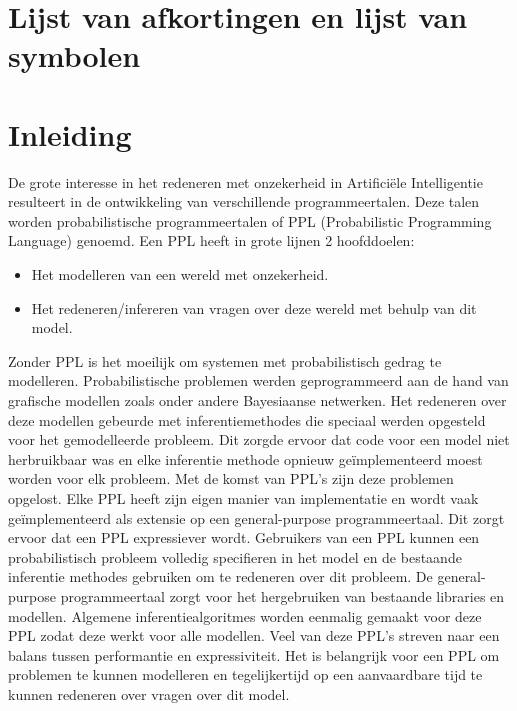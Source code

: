 \documentclass[12pt,a4paper,oneside]{book}
\theoremstyle{definition}
\begin{document}
\chapter{Lijst van afkortingen en lijst van symbolen}
\tableofcontents


\newpage
\mainmatter
\setcounter{page}{0}

\chapter{Inleiding}
De grote interesse in het redeneren met onzekerheid in Artifici\"{e}le Intelligentie resulteert in de ontwikkeling van verschillende programmeertalen. Deze talen worden probabilistische programmeertalen of PPL (Probabilistic Programming Language) genoemd. Een PPL heeft in grote lijnen 2 hoofddoelen:
\begin{itemize}
  \item Het modelleren van een wereld met onzekerheid.
  \item Het redeneren/infereren van vragen over deze wereld met behulp van dit model.
\end{itemize}
Zonder PPL is het moeilijk om systemen met probabilistisch gedrag te modelleren. Probabilistische problemen werden geprogrammeerd aan de hand van grafische modellen zoals onder andere Bayesiaanse netwerken. Het redeneren over deze modellen gebeurde met inferentiemethodes die speciaal werden opgesteld voor het gemodelleerde probleem. Dit zorgde ervoor dat code voor een model niet herbruikbaar was en elke inferentie methode opnieuw ge\"{i}mplementeerd moest worden voor elk probleem. Met de komst van PPL's zijn deze problemen opgelost. Elke PPL heeft zijn eigen manier van implementatie en wordt vaak ge\"{i}mplementeerd als extensie op een general-purpose programmeertaal. Dit zorgt ervoor dat een PPL expressiever wordt. Gebruikers van een PPL kunnen een probabilistisch probleem volledig specifieren in het model en de bestaande inferentie methodes gebruiken om te redeneren over dit probleem. De general-purpose programmeertaal zorgt voor het hergebruiken van bestaande libraries en modellen. Algemene inferentiealgoritmes worden eenmalig gemaakt voor deze PPL zodat deze werkt voor alle modellen. Veel van deze PPL’s streven naar een balans tussen performantie en expressiviteit. Het is belangrijk voor een PPL om problemen te kunnen modelleren en tegelijkertijd op een aanvaardbare tijd te kunnen redeneren over vragen over dit model.
\end{document}
